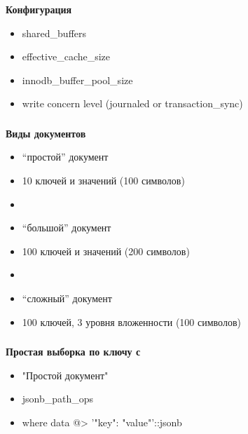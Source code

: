 \documentclass[usenames,dvipsnames, 18pt, compress, aspectratio=169]{beamer}
\begin{document}
\begin{frame}
    \frametitle{}
    \begin{center}
        \textbf{Конфигурация}
        \begin{itemize}[label={}]
            \item shared\_buffers
            \item effective\_cache\_size
            \item innodb\_buffer\_pool\_size
            \item write concern level (journaled or transaction\_sync)
        \end{itemize}
    \end{center}
\end{frame}

\begin{frame}
    \frametitle{}
    \begin{center}
        \textbf{Виды документов}
        \begin{itemize}[label={}]
            \item “простой” документ
            \item 10 ключей и значений (100 символов)
            \item
            \item “большой” документ
            \item 100 ключей и значений (200 символов)
            \item
            \item “сложный” документ
            \item 100 ключей, 3 уровня вложенности (100 символов)
        \end{itemize}
    \end{center}
\end{frame}

\begin{frame}
    \frametitle{}
    \begin{center}
        \textbf{Простая выборка по ключу с}
        \begin{itemize}[label={}]
            \item "Простой документ"
            \item jsonb\_path\_ops
            \item where data @> '{"key": "value"}'::jsonb
        \end{itemize}
    \end{center}
\end{frame}
\end{document}
